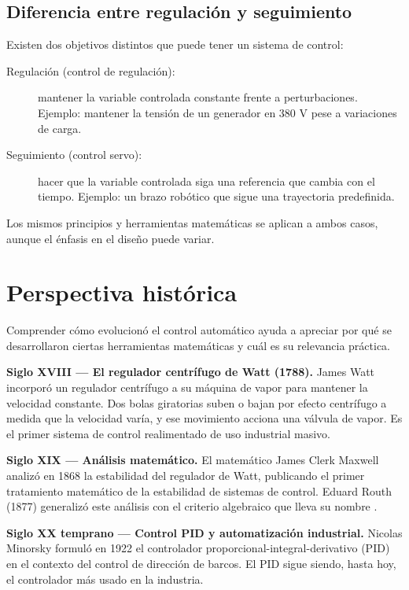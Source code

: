 \subsection{Diferencia entre regulación y seguimiento}

Existen dos objetivos distintos que puede tener un sistema de control:

\begin{description}
  \item[Regulación (control de regulación):] mantener la variable controlada
    constante frente a perturbaciones. Ejemplo: mantener la tensión de un
    generador en 380 V pese a variaciones de carga.
  \item[Seguimiento (control servo):] hacer que la variable controlada
    siga una referencia que cambia con el tiempo. Ejemplo: un brazo robótico
    que sigue una trayectoria predefinida.
\end{description}

Los mismos principios y herramientas matemáticas se aplican a ambos casos,
aunque el énfasis en el diseño puede variar.

\section{Perspectiva histórica}
\label{sec:intro-historia}

Comprender cómo evolucionó el control automático ayuda a apreciar por qué
se desarrollaron ciertas herramientas matemáticas y cuál es su relevancia práctica.

\textbf{Siglo XVIII — El regulador centrífugo de Watt (1788).}
James Watt incorporó un regulador centrífugo a su máquina de vapor para
mantener la velocidad constante. Dos bolas giratorias suben o bajan por
efecto centrífugo a medida que la velocidad varía, y ese movimiento acciona
una válvula de vapor. Es el primer sistema de control realimentado de uso
industrial masivo.

\textbf{Siglo XIX — Análisis matemático.}
El matemático James Clerk Maxwell analizó en 1868 la estabilidad del regulador
de Watt, publicando el primer tratamiento matemático de la estabilidad de
sistemas de control. Eduard Routh (1877) generalizó este análisis con el
criterio algebraico que lleva su nombre .

\textbf{Siglo XX temprano — Control PID y automatización industrial.}
Nicolas Minorsky formuló en 1922 el controlador proporcional-integral-derivativo
(PID) en el contexto del control de dirección de barcos. El PID sigue siendo,
hasta hoy, el controlador más usado en la industria.

